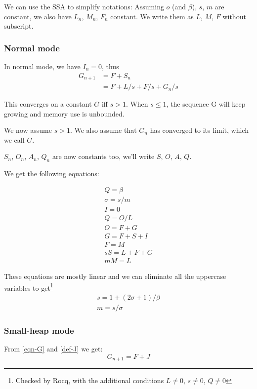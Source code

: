 \documentclass{article}
\begin{document}
We can use the SSA to simplify notations: Assuming $o$ (and $\beta$),
$s$, $m$ are constant, we also have $L_n$, $M_n$, $F_n$ constant. We
write them as $L$, $M$, $F$ without subscript.

\subsubsection{Normal mode}

In normal mode, we have $I_n = 0$, thus
\begin{equation}
\begin{split}
G_{n+1} & = F + S_n \\
        & = F + L/s + F/s + G_n/s
\end{split}
\end{equation}

This converges on a constant $G$ iff $s > 1$. When $s \leq 1$, the
sequence G will keep growing and memory use is unbounded.

We now assume $s > 1$. We also assume that $G_n$ has converged to its
limit, which we call $G$.

$S_n$, $O_n$, $A_n$, $Q_n$ are now constants too, we'll write $S$,
$O$, $A$, $Q$.

We get the following equations:

\begin{gather*}
Q = \beta      \\
\sigma = s/m   \\
I = 0          \\
Q = O / L      \\
O = F + G      \\
G = F + S + I  \\
F = M          \\
sS = L + F + G \\
mM = L
\end{gather*}

These equations are mostly linear and we can eliminate all the
uppercase variables to get\footnote{
Checked by Rocq, with the additional conditions
$L \neq 0$,
$s \neq 0$,
$Q \neq 0$
}
\begin{gather*}
s = 1 + (2\sigma + 1)/\beta \\
m = s/\sigma
\end{gather*}


\subsubsection{Small-heap mode}
From \eqref{eqn-G} and \eqref{def-J} we get:
\begin{equation}
G_{n+1} = F + J
\end{equation}
\end{document}
